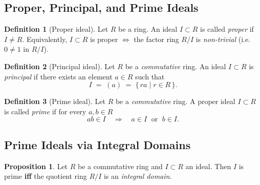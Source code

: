\documentclass[12pt]{article}
\title{}
\author{Jerich Lee}
\date{\today}
\theoremstyle{definition} %
\newtheorem{proposition}{Proposition}
\newtheorem{definition}{Definition}
\theoremstyle{plain} %
\begin{document}
\maketitle

\subsection*{Proper, Principal, and Prime Ideals}

\begin{definition}[Proper ideal]
  Let \(R\) be a ring.  
  An ideal \(I\subset R\) is called \emph{proper} if \(I\neq R\).
  Equivalently, \(I\subset R\) is proper  \(\Longleftrightarrow\)
  the factor ring \(R/I\) is \emph{non-trivial} (i.e.\ \(0\neq1\) in \(R/I\)).
\end{definition}

\begin{definition}[Principal ideal]
  Let \(R\) be a \emph{commutative} ring.  
  An ideal \(I\subset R\) is \emph{principal} if there exists an element \(a\in R\) such that  
  \[
    I \;=\; (a)\;=\;\{\,ra \mid r\in R\,\}.
  \]
\end{definition}

\begin{definition}[Prime ideal]
  Let \(R\) be a \emph{commutative} ring.  
  A proper ideal \(I\subset R\) is called \emph{prime} if for every \(a,b\in R\)
  \[
    ab\in I \quad\Longrightarrow\quad a\in I \;\text{ or }\; b\in I .
  \]
\end{definition}

\subsection*{Prime Ideals via Integral Domains}

\begin{proposition}
  Let \(R\) be a commutative ring and \(I\subset R\) an ideal.  
  Then \(I\) is prime \textbf{iff} the quotient ring \(R/I\) is an \emph{integral domain}.
\end{proposition}
\end{document}
